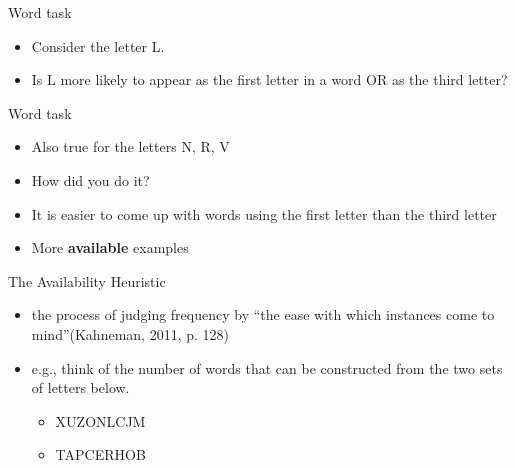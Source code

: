 \documentclass[
  ignorenonframetext,
]{beamer}
\providecommand{\tightlist}{%
  \setlength{\itemsep}{0pt}\setlength{\parskip}{0pt}}\usepackage{longtable,booktabs,array}
\begin{document}
\begin{frame}{Word task}
\protect\hypertarget{word-task-1}{}
\begin{itemize}
\tightlist
\item
  Consider the letter L.
\end{itemize}

\begin{itemize}
\tightlist
\item
  Is L more likely to appear as the first letter in a word OR as the
  third letter?
\end{itemize}
\end{frame}

\begin{frame}{Word task}
\protect\hypertarget{word-task-2}{}
\begin{itemize}
\item
  Also true for the letters N, R, V
\item
  How did you do it?
\item
  It is easier to come up with words using the first letter than the
  third letter
\item
  More \textbf{available} examples
\end{itemize}
\end{frame}

\begin{frame}{The Availability Heuristic}
\protect\hypertarget{the-availability-heuristic}{}
\begin{itemize}
\tightlist
\item
  the process of judging frequency by ``the ease with which instances
  come to mind''(Kahneman, 2011, p. 128)
\end{itemize}

\begin{itemize}
\tightlist
\item
  e.g., think of the number of words that can be constructed from the
  two sets of letters below.

  \begin{itemize}
  \tightlist
  \item
    XUZONLCJM
  \item
    TAPCERHOB
  \end{itemize}
\end{itemize}
\end{frame}
\end{document}
